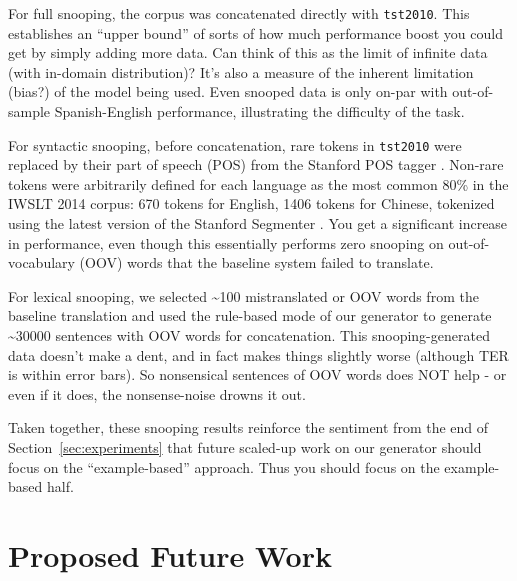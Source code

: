 {For full snooping, the corpus was concatenated directly with {\small \tt tst2010}. 
This establishes an ``upper bound'' of sorts of how much performance boost you could get by simply adding more data.
Can think of this as the limit of infinite data (with in-domain distribution)?
It's also a measure of the inherent limitation (bias?) of the model being used.
Even snooped data is only on-par with out-of-sample Spanish-English performance, illustrating the difficulty of the task.

For syntactic snooping, before concatenation, rare tokens in {\small \tt tst2010} were replaced by their part of speech (POS) from the Stanford POS tagger . 
 Non-rare tokens were arbitrarily defined for each language as the most common 80\% in the IWSLT 2014 corpus: 670 tokens for English, 1406 tokens for Chinese, tokenized using the latest version of the Stanford Segmenter .
You get a significant increase in performance, even though this essentially performs zero snooping on out-of-vocabulary (OOV) words that the baseline system failed to translate.

For lexical snooping, we selected \textasciitilde 100 mistranslated or OOV words from the baseline translation and used the rule-based mode of our generator to generate \textasciitilde 30000 sentences with OOV words for concatenation.
This snooping-generated data doesn't make a dent, and in fact makes things slightly worse (although TER is within error bars).
So nonsensical sentences of OOV words does NOT help - or even if it does, the nonsense-noise drowns it out.

Taken together, these snooping results reinforce the sentiment from the end of Section~\ref{sec:experiments} that future scaled-up work on our generator should focus on the ``example-based'' approach.
Thus  you should focus on the example-based half.






% 




} %








\section{Proposed Future Work}
\label{sec:future}


